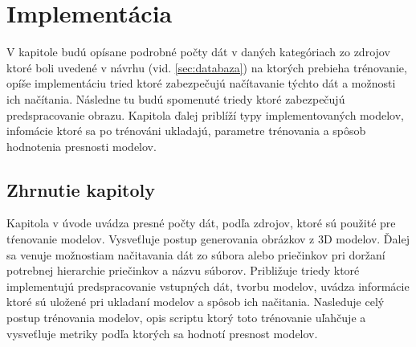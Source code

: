 
\chapter{Implementácia}

V kapitole budú opísane podrobné počty dát v daných kategóriach zo zdrojov ktoré boli uvedené v návrhu (vid. \ref{sec:databaza})
    na ktorých prebieha trénovanie, opíše implementáciu tried ktoré zabezpečujú načítavanie týchto dát a možnosti ich načítania.
Následne tu budú spomenuté triedy ktoré zabezpečujú predspracovanie obrazu.
Kapitola ďalej priblíží typy implementovaných modelov, infomácie ktoré sa po trénováni ukladajú, parametre trénovania a spôsob hodnotenia presnosti modelov.









\section{Zhrnutie kapitoly}

Kapitola v úvode uvádza presné počty dát, podľa zdrojov, ktoré sú použité pre tŕenovanie modelov.
Vysveťluje postup generovania obrázkov z 3D modelov.
Ďalej sa venuje možnostiam načitavania dát zo súbora alebo priečinkov pri doržaní potrebnej hierarchie priečinkov a názvu súborov.
Približuje triedy ktoré implementujú predspracovanie vstupných dát, tvorbu modelov, uvádza informácie ktoré sú uložené
    pri ukladaní modelov a spôsob ich načitania.
Nasleduje celý postup trénovania modelov, opis scriptu ktorý toto trénovanie uľahčuje a vysveťluje metriky podľa ktorých sa hodnotí presnost modelov.
